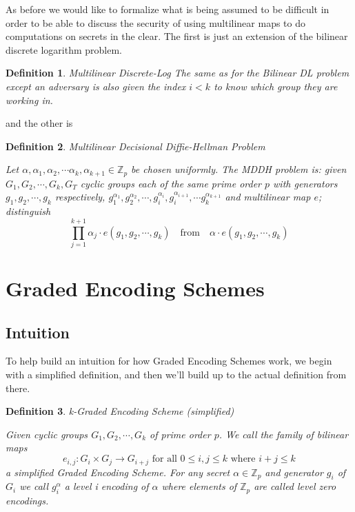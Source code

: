 \documentclass[12pt,twoside]{reedthesis}
\newtheorem{definition}{Definition}
\newcommand{\Z}[0]{\mathbb{Z}}
\begin{document}
 As before we would like to formalize what is being assumed to be difficult in order to be able to discuss the security of using multilinear maps to do computations on secrets in the clear. The first is just an extension of the bilinear discrete logarithm problem.
 
 \begin{definition}{Multilinear Discrete-Log}
 The same as for the Bilinear DL problem except an adversary is also given the index $i<k$ to know which group they are working in.
 \end{definition}
 
 and the other is
 
 \begin{definition}{Multilinear Decisional Diffie-Hellman Problem}
\par Let $\alpha,\alpha_1,\alpha_2,\cdots \alpha_k, \alpha_{k+1} \in \Z_p$ be chosen uniformly. The MDDH problem is: given $G_1,G_2, \cdots, G_k,G_T$ cyclic groups each of the same prime order $p$ with generators $g_1,g_2,\cdots, g_k$ respectively, $g_1^{\alpha_1}, g_2^{\alpha_2}, \cdots, g_i^{\alpha_i} , g_i^{\alpha_{i+1}},\cdots g_k^{\alpha_{k+1}}$ and multilinear map $e$; distinguish 
$$\prod_{j=1}^{k+1}\alpha_j \cdot e(g_1,g_2,\cdots,g_k)  \quad \text{from} \quad \alpha \cdot e(g_1,g_2,\cdots ,g_k)$$
 \end{definition}    
    
            
    
    \section{Graded Encoding Schemes}
    
      
    \subsection{Intuition}
    To help build an intuition for how Graded Encoding Schemes work, we begin with a simplified definition, and then we'll build up to the actual definition from there.    
    
    \begin{definition}{k-Graded Encoding Scheme (simplified)} 
    \par Given cyclic groups $G_1,G_2, \cdots , G_k$ of prime order $p$. We call the family of bilinear maps $$e_{i,j}:G_i \times G_j \rightarrow G_{i+j} \text{ for all } 0 \leq i,j \leq k \text{ where } i+j \leq k$$
    a simplified Graded Encoding Scheme. For any secret $\alpha \in \Z_p$ and generator $g_i$ of $G_i$ we call $g_i^\alpha$ a level i encoding of $\alpha$ where elements of $\Z_p$ are called level zero encodings. 
    \end{definition}
    
\end{document}
